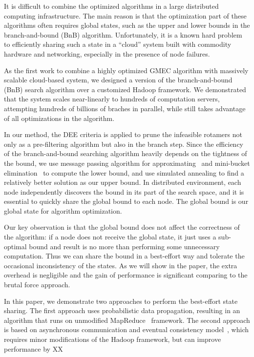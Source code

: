 It is difficult to combine the optimized algorithms in a large distributed computing infrastructure. The main reason is that the optimization part of these algorithms often requires global states, such as the upper and lower bounds in the branch-and-bound (BnB) algorithm. Unfortunately, it is a known hard problem to efficiently sharing such a state in a ``cloud'' system built with commodity hardware and networking, especially in the presence of node failures.

As the first work to combine a highly optimized GMEC algorithm with massively scalable cloud-based system, we designed a version of the branch-and-bound (BnB) search algorithm over a customized Hadoop framework. We demonstrated that the system scales near-linearly to hundreds of computation servers, attempting hundreds of billions of braches in parallel, while still takes advantage of all optimizations in the algorithm.

In our method, the DEE criteria is applied to prune the infeasible rotamers not only as a pre-filtering algorithm but also in the branch step. Since the efficiency of the branch-and-bound searching algorithm heavily depends on the tightness of the bound, we use message passing algorithm for approximating~\cite[]{globerson2008fixing} and mini-bucket elimination~\cite[]{rollon2010evaluating} to compute the lower bound, and use simulated annealing to find a relatively better solution as our upper bound. In distributed environment, each node independently discovers the bound in its part of the search space, and it is essential to quickly share the global bound to each node. The global bound is our global state for algorithm optimization.

Our key observation is that the global bound does not affect the correctness of
the algorithm: if a node does not receive the global state, it just uses a
sub-optimal bound and result is no more than performing some unnecessary
computation. Thus we can share the bound in a best-effort way and tolerate the
occasional inconsistency of the states. As we will show in the paper, the extra
overhead is negligible and the gain of performance is significant comparing to
the brutal force approach.

In this paper, we demonstrate two approaches to perform the best-effort state
sharing. The first approach uses probabilistic data propagation, resulting in an
algorithm that runs on unmodified MapReduce~\cite[]{} framework. The second
approach is based on asynchronous communication and eventual consistency
model~\cite[]{}, which requires minor modifications of the Hadoop framework, but
can improve performance by XX%

